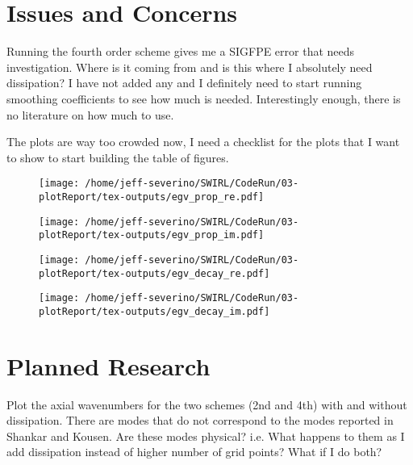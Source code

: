 \documentclass[a4paper]{article}
\begin{document}
\section{Issues and Concerns}
Running the fourth order scheme gives me a SIGFPE error that needs investigation. 
Where is it coming from and is this where I absolutely need dissipation? I 
have not added any and I definitely need to start running smoothing coefficients
to see how much is needed. Interestingly enough, there is no literature on
how much to use.

The plots are way too crowded now, I need a checklist for the plots that I want to
show to start building the table of figures.


 \begin{figure}
     \centering
     \texttt{[image: /home/jeff-severino/SWIRL/CodeRun/03-plotReport/tex-outputs/egv\_prop\_re.pdf]}
 \end{figure}


 \begin{figure}
     \centering
     \texttt{[image: /home/jeff-severino/SWIRL/CodeRun/03-plotReport/tex-outputs/egv\_prop\_im.pdf]}
 \end{figure}


 \begin{figure}
     \centering
     \texttt{[image: /home/jeff-severino/SWIRL/CodeRun/03-plotReport/tex-outputs/egv\_decay\_re.pdf]}
 \end{figure}


 \begin{figure}
     \centering
     \texttt{[image: /home/jeff-severino/SWIRL/CodeRun/03-plotReport/tex-outputs/egv\_decay\_im.pdf]}
 \end{figure}



\section{Planned Research}

Plot the axial wavenumbers for the two schemes (2nd and 4th) with and without
dissipation. There are modes that do not correspond to the modes reported in 
Shankar and Kousen. Are these modes physical? i.e. What happens to them as 
I add dissipation instead of higher number of grid points? What if I do both?
\end{document}
